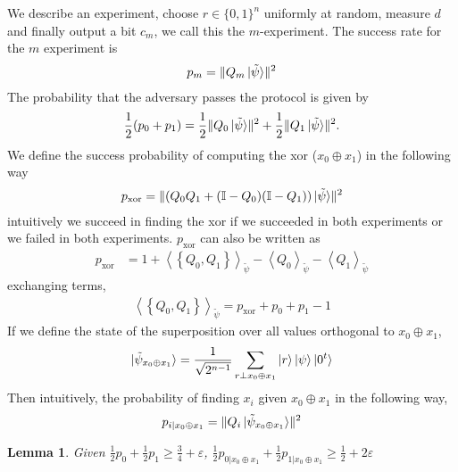 \documentclass{article}
\newtheorem{lem}[thm]{Lemma}
\begin{document}
We describe an experiment, choose $r\in \{0,1\}^{n}$ uniformly at random, measure $d$ and finally output a bit $c_{m}$, we call this the $m$-experiment. The success rate for the $m$ experiment is \begin{align}p_{m}=\lVert Q_{m} \ket{\tilde{\psi}}\rVert^{2}\end{align}
The probability that the adversary passes the protocol is given by \begin{align}\frac{1}{2}(p_{0}+p_{1})=\frac{1}{2}\lVert Q_{0} \ket{\tilde{\psi}}\rVert^{2} + \frac{1}{2}\lVert Q_{1} \ket{\tilde{\psi}}\rVert^{2}.\end{align} We define the success probability of computing the xor ($x_{0}\oplus x_{1}$) in the following way \begin{align}p_{\mathrm{xor}}=\lVert(Q_{0}Q_{1}+(\mathbb{I}-Q_{0})(\mathbb{I}-Q_{1}))\ket{\tilde{\psi}}\rVert^{2}
\end{align} intuitively we succeed in finding the xor if we succeeded in both experiments or we failed in both experiments. $p_{\mathrm{xor}}$ can also be written as \begin{align}
    p_{\mathrm{xor}} &= 1 + \left<\left\{Q_{0},Q_{1}\right\}\right>_{\tilde{\psi}} - \left<Q_{0}\right>_{\tilde{\psi}} - \left<Q_{1}\right>_{\tilde{\psi}}
\end{align} exchanging terms, \begin{align}
    \left<\left\{Q_{0},Q_{1}\right\}\right>_{\tilde{\psi}} = p_{\mathrm{xor}} + p_{0} + p_{1} - 1
\end{align}
If we define the state of the superposition over all values orthogonal to $x_{0}\oplus x_{1}$, \begin{align}\ket{\tilde{\psi}_{x_{0}\oplus x_{1}}}=\frac{1}{\sqrt{2^{n-1}}}\sum_{r\perp x_{0}\oplus x_{1}}\ket{r}\ket{\psi}\ket{0^{t}}\end{align} Then intuitively, the probability of finding $x_{i}$ given $x_{0}\oplus x_{1}$ in the following way, \begin{align}p_{i|x_{0}\oplus x_{1}}=\lVert Q_{i}\ket{\tilde{\psi}_{x_{0}\oplus x_{1}}}\rVert^{2}\end{align} \begin{lem} \label{lemma3}
Given $\frac{1}{2}p_{0}+\frac{1}{2}p_{1} \geq \frac{3}{4}+\varepsilon$, $\frac{1}{2}p_{0|x_{0}\oplus x_{1}} + \frac{1}{2}p_{1|x_{0}\oplus x_{1}} \geq \frac{1}{2}+2\varepsilon$
\end{lem}
\end{document}
